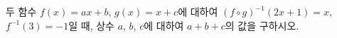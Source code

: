 두 함수 $f(x)=ax+b$, $g(x)=x+c$에 대하여 $(f\circ g)^{-1}(2x+1)=x$, $f^{-1}(3)=-1$일 때, 상수 $a$, $b$, $c$에 대하여 $a+b+c$의 값을 구하시오.
